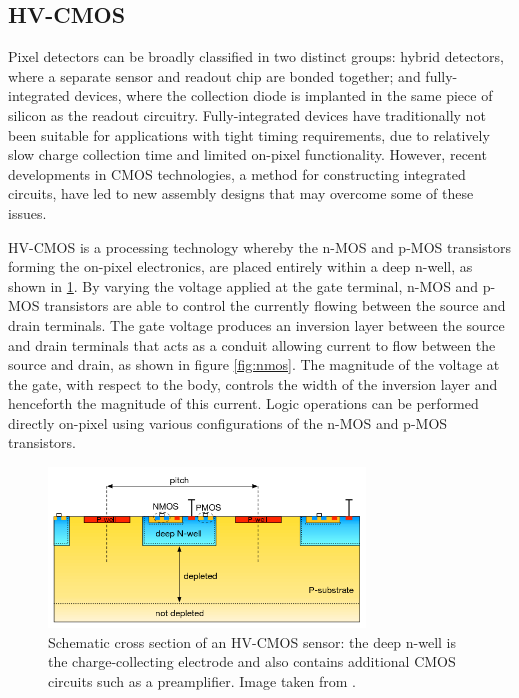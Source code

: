 \subsection{HV-CMOS}

Pixel detectors can be broadly classified in two distinct groups: hybrid detectors, where a separate sensor and readout chip are bonded together; and fully-integrated devices, where the collection diode is implanted in the same piece of silicon as the readout circuitry.  Fully-integrated devices have traditionally not been suitable for applications with tight timing requirements, due to relatively slow charge collection time and limited on-pixel functionality.  However, recent developments in CMOS technologies, a method for constructing integrated circuits, have led to new assembly designs that may overcome some of these issues. 

HV-CMOS is a processing technology whereby the n-MOS and p-MOS transistors forming the on-pixel electronics, are placed entirely within a deep n-well, as shown in \ref{fig:hvcmos}.  By varying the voltage applied at the gate terminal, n-MOS and p-MOS transistors are able to control the currently flowing between the source and drain terminals.  The gate voltage produces an inversion layer between the source and drain terminals that acts as a conduit allowing current to flow between the source and drain, as shown in figure \ref{fig:nmos}.  The magnitude of the voltage at the gate, with respect to the body, controls the width of the inversion layer and henceforth the magnitude of this current.  Logic operations can be performed directly on-pixel using various configurations of the n-MOS and p-MOS transistors.

\begin{figure}[h!]
\centering
\includegraphics[width=0.75\textwidth]{CLICdpVertex/Plots/HV-CMOSDiagram.png}
\caption[Schematic cross section of an HV-CMOS sensor: the deep n-well is the charge-collecting electrode and also contains additional CMOS circuits such as a preamplifier.  Image taken from \cite{Benoit:2016vup}.]{Schematic cross section of an HV-CMOS sensor: the deep n-well is the charge-collecting electrode and also contains additional CMOS circuits such as a preamplifier.  Image taken from \cite{Benoit:2016vup}.}
\label{fig:hvcmos}
\end{figure}

